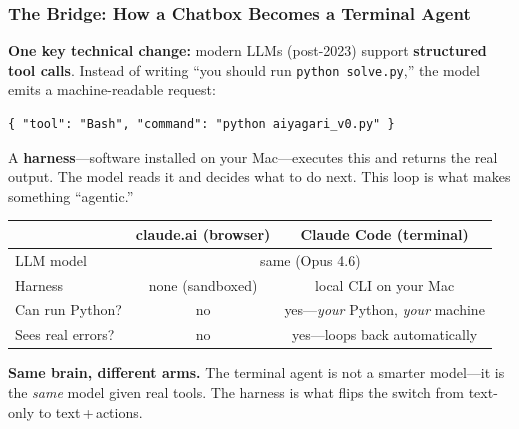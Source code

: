 \documentclass[10pt,english,aspectratio=169]{beamer}
\begin{document}
\begin{frame}[fragile]
\frametitle{The Bridge: How a Chatbox Becomes a Terminal Agent}

\textbf{One key technical change:} modern LLMs (post-2023) support \textbf{structured tool calls}.
Instead of writing ``you should run \texttt{python solve.py},'' the model emits a machine-readable request:

\begin{lstlisting}[style=pythonstyle,language={},basicstyle=\ttfamily\scriptsize,numbers=none]
{ "tool": "Bash", "command": "python aiyagari_v0.py" }
\end{lstlisting}

A \textbf{harness}---software installed on your Mac---executes this and returns the real output. The model reads it and decides what to do next. This loop is what makes something ``agentic.''

\vspace{0.2cm}

\begin{center}
\small
\begin{tabular}{|l|c|c|}
\hline
& \textbf{claude.ai (browser)} & \textbf{Claude Code (terminal)} \\ \hline
LLM model & \multicolumn{2}{c|}{same (Opus 4.6)} \\ \hline
Harness & none (sandboxed) & local CLI on your Mac \\ \hline
Can run Python? & no & yes---\textit{your} Python, \textit{your} machine \\ \hline
Sees real errors? & no & yes---loops back automatically \\ \hline
\end{tabular}
\end{center}

\vspace{0.2cm}

\textbf{Same brain, different arms.} The terminal agent is not a smarter model---it is the \textit{same} model given real tools. The harness is what flips the switch from text-only to text\,+\,actions.
\end{frame}
\end{document}
